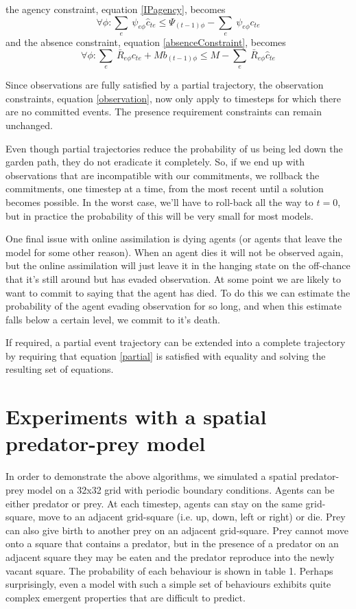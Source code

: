 \documentclass{article}
\begin{document}
the agency constraint, equation \ref{IPagency}, becomes
\begin{equation}
\forall\phi:  \sum_e\ \psi_{e\phi}\hat{c}_{te} \le \Psi_{(t-1)\phi}  -  \sum_e\ \psi_{e\phi} c_{te}
\end{equation}
and the absence constraint, equation \ref{absenceConstraint}, becomes
\begin{equation}
\forall\phi: \sum_e\ \bar{R}_{e\phi} c_{te} + Mb_{(t-1)\phi} \le M - \sum_e\ \bar{R}_{e\phi} \hat{c}_{te}
\end{equation}

Since observations are fully satisfied by a partial trajectory, the observation constraints, equation \ref{observation}, now only apply to timesteps for which there are no committed events. The presence requirement constraints can remain unchanged.

Even though partial trajectories reduce the probability of us being led down the garden path, they do not eradicate it completely. So, if we end up with observations that are incompatible with our commitments, we rollback the commitments, one timestep at a time, from the most recent until a solution becomes possible. In the worst case, we'll have to roll-back all the way to $t=0$, but in practice the probability of this will be very small for most models.

One final issue with online assimilation is dying agents (or agents that leave the model for some other reason). When an agent dies it will not be observed again, but the online assimilation will just leave it in the hanging state on the off-chance that it's still around but has evaded observation. At some point we are likely to want to commit to saying that the agent has died. To do this we can estimate the probability of the agent evading observation for so long, and when this estimate falls below a certain level, we commit to it's death.

If required, a partial event trajectory can be extended into a complete trajectory by requiring that equation \ref{partial} is satisfied with equality and solving the resulting set of equations.

\section{Experiments with a spatial predator-prey model}

In order to demonstrate the above algorithms, we simulated a spatial predator-prey model on a 32x32 grid with periodic boundary conditions. Agents can be either predator or prey. At each timestep, agents can stay on the same grid-square, move to an adjacent grid-square (i.e. up, down, left or right) or die. Prey can also give birth to another prey on an adjacent grid-square. Prey cannot move onto a square that contains a predator, but in the presence of a predator on an adjacent square they may be eaten and the predator reproduce into the newly vacant square. The probability of each behaviour is shown in table 1. Perhaps surprisingly, even a model with such a simple set of behaviours exhibits quite complex emergent properties that are difficult to predict.
\end{document}
